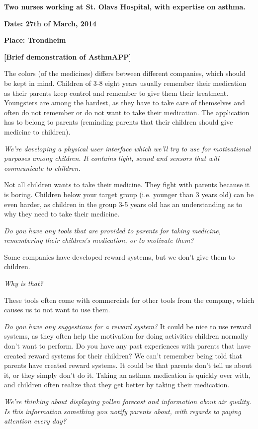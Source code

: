 \textbf{Two nurses working at St. Olavs Hospital, with expertise on asthma.} 

\textbf{Date: 27th of March, 2014}

\textbf{Place: Trondheim}

\textbf{[Brief demonstration of AsthmAPP]}

The colors (of the medicines) differs between different companies, which should be kept in mind. 
Children of 3-8 eight years usually remember their medication as their parents keep control and remember to give them their treatment. 
Youngsters are among the hardest, as they have to take care of themselves and often do not remember or do not want to take their medication. The application has to belong to parents (reminding parents that their children should give medicine to children). 

\emph{We're developing a physical user interface which we'll try to use for motivational purposes among children. It contains light, sound and sensors that will communicate to children.} 

Not all children wants to take their medicine. They fight with parents because it is boring. Children below your target group (i.e. younger than 3 years old) can be even harder, as children in the group 3-5 years old has an understanding as to why they need to take their medicine. 

\emph{Do you have any tools that are provided to parents for taking medicine, remembering their children's medication, or to motivate them?}

Some companies have developed reward systems, but we don't give them to children.

\emph{Why is that?}

These tools often come with commercials for other tools from the company, which causes us to not want to use them. 

\emph{Do you have any suggestions for a reward system?}
It could be nice to use reward systems, as they often help the motivation for doing activities children normally don't want to perform.
Do you have any past experiences with parents that have created reward systems for their children?
 We can't remember being told that parents have created reward systems. It could be that parents don't tell us about it, or they simply don't do it. Taking an asthma medication is quickly over with, and children often realize that they get better by taking their medication.

\emph{We're thinking about displaying pollen forecast and information about air quality. Is this information something you notify parents about, with regards to paying attention every day?}

